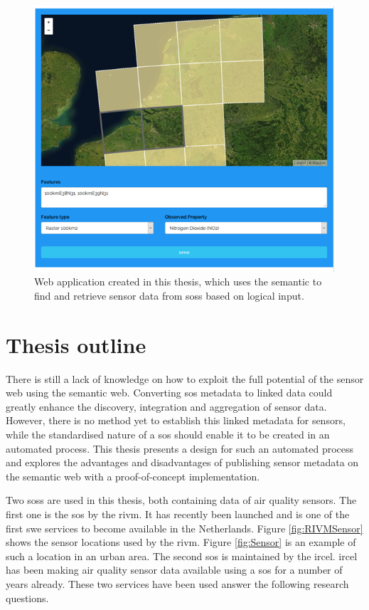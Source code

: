 \begin{figure}
	\centering
	\includegraphics[width=0.8\linewidth]{figs/interface1.PNG}
	\caption{Web application created in this thesis, which uses the semantic to find and retrieve sensor data from \aclp*{sos} based on logical input.}
	\label{fig:logical}
\end{figure}


\section{Thesis outline}
There is still a lack of knowledge on how to exploit the full potential of the sensor web using the semantic web. Converting \ac{sos} metadata to linked data could greatly enhance the discovery, integration and aggregation of sensor data. However, there is no method yet to establish this linked metadata for sensors, while the standardised nature of a \ac{sos} should enable it to be created in an automated process. This thesis presents a design for such an automated process and explores the advantages and disadvantages of publishing sensor metadata on the semantic web with a proof-of-concept implementation. 

Two \aclp{sos} are used in this thesis, both containing data of air quality sensors. The first one is the \ac{sos} by the \ac{rivm}. It has recently been launched and is one of the first \ac{swe} services to become available in the Netherlands. Figure \ref{fig:RIVMSensor} shows the sensor locations used by the \ac{rivm}. Figure \ref{fig:Sensor} is an example of such a location in an urban area. The second \ac{sos} is maintained by the \acf{ircel}. \ac{ircel} has been making air quality sensor data available using a \ac{sos} for a number of years already. These two services have been used answer the following research questions. 


